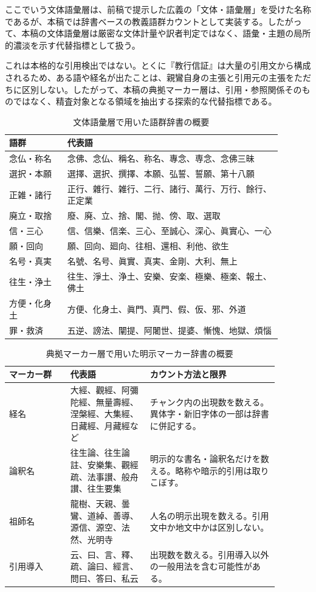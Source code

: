 \documentclass[uplatex,dvipdfmx,11pt,a4paper]{jsarticle}
\begin{document}
ここでいう文体語彙層は、前稿で提示した広義の「文体・語彙層」を受けた名称であるが、本稿では辞書ベースの教義語群カウントとして実装する。したがって、本稿の文体語彙層は厳密な文体計量や訳者判定ではなく、語彙・主題の局所的濃淡を示す代替指標として扱う。

これは本格的な引用検出ではない。とくに『教行信証』は大量の引用文から構成されるため、ある語や経名が出たことは、親鸞自身の主張と引用元の主張をただちに区別しない。したがって、本稿の典拠マーカー層は、引用・参照関係そのものではなく、精査対象となる領域を抽出する探索的な代替指標である。

\begin{table}[H]
\centering
\footnotesize
\caption{文体語彙層で用いた語群辞書の概要}
\label{tab:style-lexicon}
\begin{tabular}{@{}p{0.19\linewidth}p{0.70\linewidth}@{}}
\toprule
語群 & 代表語 \\
\midrule
念仏・称名 & 念佛、念仏、稱名、称名、專念、専念、念佛三昧 \\
選択・本願 & 選擇、選択、撰擇、本願、弘誓、誓願、第十八願 \\
正雑・諸行 & 正行、雜行、雑行、二行、諸行、萬行、万行、餘行、正定業 \\
廃立・取捨 & 廢、廃、立、捨、閣、抛、傍、取、選取 \\
信・三心 & 信、信樂、信楽、三心、至誠心、深心、眞實心、一心 \\
願・回向 & 願、回向、廻向、往相、還相、利他、欲生 \\
名号・真実 & 名號、名号、眞實、真実、金剛、大利、無上 \\
往生・浄土 & 往生、淨土、浄土、安樂、安楽、極樂、極楽、報土、佛土 \\
方便・化身土 & 方便、化身土、眞門、真門、假、仮、邪、外道 \\
罪・救済 & 五逆、謗法、闡提、阿闍世、提婆、慚愧、地獄、煩惱 \\
\bottomrule
\end{tabular}
\end{table}

\begin{table}[H]
\centering
\footnotesize
\caption{典拠マーカー層で用いた明示マーカー辞書の概要}
\label{tab:source-marker-lexicon}
\begin{tabular}{@{}p{0.20\linewidth}p{0.26\linewidth}p{0.42\linewidth}@{}}
\toprule
マーカー群 & 代表語 & カウント方法と限界 \\
\midrule
経名 & 大經、觀經、阿彌陀經、無量壽經、涅槃經、大集經、日藏經、月藏經など & チャンク内の出現数を数える。異体字・新旧字体の一部は辞書に併記する。 \\
論釈名 & 往生論、往生論註、安樂集、觀經疏、法事讃、般舟讃、往生要集 & 明示的な書名・論釈名だけを数える。略称や暗示的引用は取りこぼす。 \\
祖師名 & 龍樹、天親、曇鸞、道綽、善導、源信、源空、法然、光明寺 & 人名の明示出現を数える。引用文中か地文中かは区別しない。 \\
引用導入 & 云、曰、言、釋、疏、論曰、經言、問曰、答曰、私云 & 出現数を数える。引用導入以外の一般用法を含む可能性がある。 \\
\bottomrule
\end{tabular}
\end{table}
\end{document}
